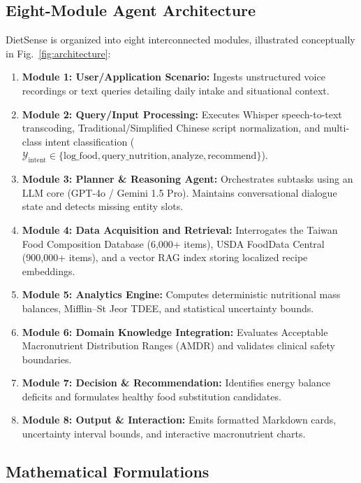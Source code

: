 \documentclass[conference]{IEEEtran}
\begin{document}
\subsection{Eight-Module Agent Architecture}
DietSense is organized into eight interconnected modules, illustrated conceptually in Fig.~\ref{fig:architecture}:
\begin{enumerate}
    \item \textbf{Module 1: User/Application Scenario:} Ingests unstructured voice recordings or text queries detailing daily intake and situational context.
    \item \textbf{Module 2: Query/Input Processing:} Executes Whisper speech-to-text transcoding, Traditional/Simplified Chinese script normalization, and multi-class intent classification ($\mathcal{Y}_{\text{intent}} \in \{\text{log\_food}, \text{query\_nutrition}, \text{analyze}, \text{recommend}\}$).
    \item \textbf{Module 3: Planner \& Reasoning Agent:} Orchestrates subtasks using an LLM core (GPT-4o / Gemini 1.5 Pro). Maintains conversational dialogue state and detects missing entity slots.
    \item \textbf{Module 4: Data Acquisition and Retrieval:} Interrogates the Taiwan Food Composition Database (6,000+ items), USDA FoodData Central (900,000+ items), and a vector RAG index storing localized recipe embeddings.
    \item \textbf{Module 5: Analytics Engine:} Computes deterministic nutritional mass balances, Mifflin--St Jeor TDEE, and statistical uncertainty bounds.
    \item \textbf{Module 6: Domain Knowledge Integration:} Evaluates Acceptable Macronutrient Distribution Ranges (AMDR) and validates clinical safety boundaries.
    \item \textbf{Module 7: Decision \& Recommendation:} Identifies energy balance deficits and formulates healthy food substitution candidates.
    \item \textbf{Module 8: Output \& Interaction:} Emits formatted Markdown cards, uncertainty interval bounds, and interactive macronutrient charts.
\end{enumerate}

\subsection{Mathematical Formulations}
\end{document}
